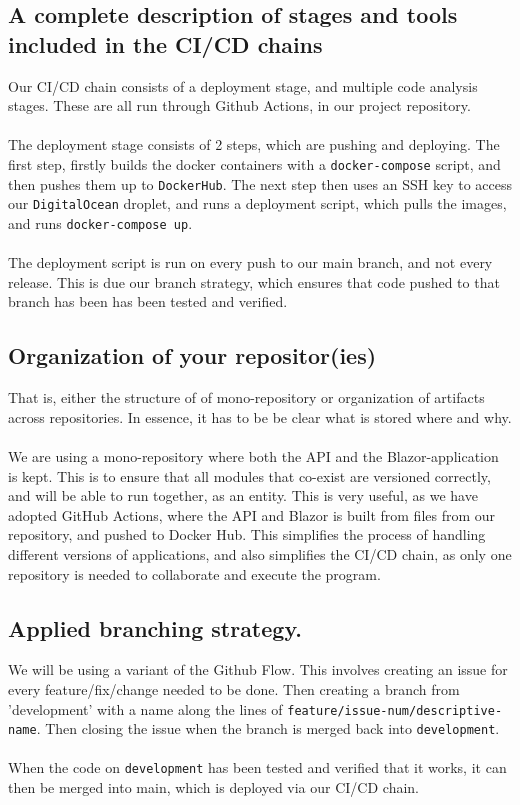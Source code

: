 \documentclass{article}
\begin{document}
\subsection{A complete description of stages and tools included in the CI/CD chains}
Our CI/CD chain consists of a deployment stage, and multiple code analysis stages. These are all run through Github Actions, in our project repository.
\\\\
The deployment stage consists of 2 steps, which are pushing and deploying. The first step, firstly builds the docker containers with a \verb|docker-compose| script, and then pushes them up to \verb|DockerHub|. The next step then uses an SSH key to access our \verb|DigitalOcean| droplet, and runs a deployment script, which pulls the images, and runs \verb|docker-compose up|.
\\\\
The deployment script is run on every push to our main branch, and not every release. This is due our branch strategy, which ensures that code pushed to that branch has been has been tested and verified.


\subsection{Organization of your repositor(ies)}
That is, either the structure of of mono-repository or organization of artifacts across repositories.
In essence, it has to be be clear what is stored where and why.
\\\\
We are using a mono-repository where both the API and the Blazor-application is kept. This is to ensure that all modules that co-exist are versioned correctly, and will be able to run together, as an entity. This is very useful, as we have adopted GitHub Actions, where the API and Blazor is built from files from our repository, and pushed to Docker Hub. This simplifies the process of handling different versions of applications, and also simplifies the CI/CD chain, as only one repository is needed to collaborate and execute the program.

\subsection{Applied branching strategy.}
We will be using a variant of the Github Flow. This involves creating an issue for every feature/fix/change needed to be done. Then creating a branch from 'development' with a name along the lines of \verb|feature/issue-num/descriptive-name|. Then closing the issue when the branch is merged back into \verb|development|.
\\\\
When the code on \verb|development| has been tested and verified that it works, it can then be merged into main, which is deployed via our CI/CD chain.
\end{document}
